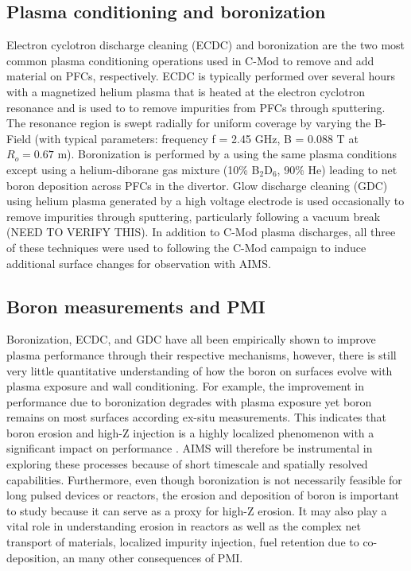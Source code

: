 \documentclass[final,3p,times,twocolumn]{elsarticle}
\begin{document}
\subsection{Plasma conditioning and boronization}
Electron cyclotron discharge cleaning (ECDC) and boronization are the two most common plasma conditioning operations used in C-Mod to remove and add material on PFCs, respectively. ECDC is typically performed over several hours with a magnetized helium plasma that is heated at the electron cyclotron resonance and is used to to remove impurities from PFCs through sputtering. The resonance region is swept radially for uniform coverage by varying the B-Field (with typical parameters: frequency f = 2.45 GHz, B = 0.088 T at $R_o = 0.67$ m). Boronization is performed by a using the same plasma conditions except using a helium-diborane gas mixture (10\% B$_2$D$_6$, 90\% He) leading to net boron deposition across PFCs in the divertor. Glow discharge cleaning (GDC) using helium plasma generated by a high voltage electrode is used occasionally to remove impurities through sputtering, particularly following a vacuum break (NEED TO VERIFY THIS). In addition to C-Mod plasma discharges, all three of these techniques were used to following the C-Mod campaign to induce additional surface changes for observation with AIMS.

\subsection{Boron measurements and PMI}
Boronization, ECDC, and GDC have all been empirically shown to improve plasma performance through their respective mechanisms, however, there is still very little quantitative understanding of how the boron on surfaces evolve with plasma exposure and wall conditioning. For example, the improvement in performance due to boronization degrades with plasma exposure yet boron remains on most surfaces according ex-situ measurements. This indicates that boron erosion and high-Z injection is a highly localized phenomenon with a significant impact on performance \cite{WWoBoronization}. AIMS will therefore be instrumental in exploring these processes because of short timescale and spatially resolved capabilities. Furthermore, even though boronization is not necessarily feasible for long pulsed devices or reactors, the erosion and deposition of boron is important to study because it can serve as a proxy for high-Z erosion. It may also play a vital role in understanding erosion in reactors as well as the complex net transport of materials, localized impurity injection, fuel retention due to co-deposition, an many other consequences of PMI.
\end{document}
